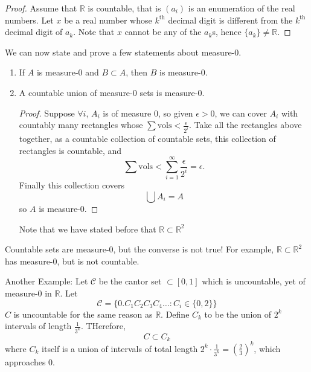 \documentclass{article}
\begin{document}
\begin{proof}
    Assume that $\mathbb{R}$ is countable, that is $(a_i)$ is an enumeration of the real numbers. Let $x$ be a real number whose $k^\text{th}$ decimal digit is different from the $k^\text{th}$ decimal digit of $a_k$. Note that $x$ cannot be any of the $a_k$s, hence $\{a_k\}\neq \mathbb{R}$.
\end{proof}
We can now state and prove a few statements about measure-$0$.
\begin{enumerate}
    \item If $A$ is measure-$0$ and $B\subset A$, then $B$ is measure-$0$.
    \item A countable union of measure-$0$ sets is measure-$0$.
          \begin{proof}
              Suppose $\forall i$, $A_i$ is of measure $0$, so given $\epsilon > 0$, we can cover $A_i$ with countably many rectangles whose $\sum\text{vols} < \frac{\epsilon}{2^i}$. Take all the rectangles above together, as a countable collection of countable sets, this collection of rectangles is countable, and
              \begin{equation}
                  \sum\text{vols} < \sum_{i=1}^\infty \frac{\epsilon}{2^i} = \epsilon.
              \end{equation}
              Finally this collection covers
              \begin{equation}
                  \bigcup A_i = A
              \end{equation}
              so $A$ is measure-$0$.
          \end{proof}
          Note that we have stated before that $\mathbb{R} \subset \mathbb{R}^2$
\end{enumerate}
\begin{warning}
    Countable sets are measure-$0$, but the converse is not true! For example, $\mathbb{R}\subset\mathbb{R}^2$ has measure-$0$, but is not countable.
\end{warning}
Another Example: Let $\mathcal{C}$ be the cantor set $\subset [0,1]$ which is uncountable, yet of measure-$0$ in $\mathbb{R}$. Let
\begin{equation}
    \mathcal{C} = \{0.C_1C_2C_3C_4\dots: C_i \in \{0,2\}\}
\end{equation}
$C$ is uncountable for the same reason as $\mathbb{R}$. Define $C_k$ to be the union of $2^k$ intervals of length $\frac{1}{3^k}$. THerefore,
\begin{equation}
    C \subset C_k
\end{equation}
where $C_k$ itself is a union of intervals of total length $2^k \cdot \frac{1}{3^k} = \left(\frac{2}{3}\right)^k$, which approaches $0$.
\end{document}
